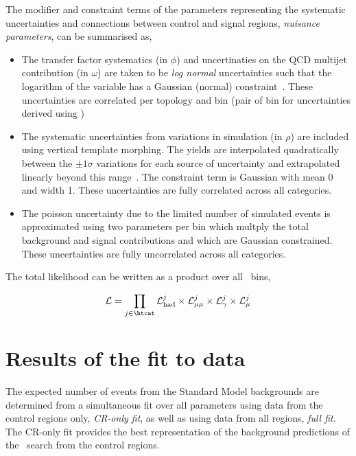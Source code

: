 The modifier and constraint terms of the parameters representing the systematic uncertainties and 
connections between control and signal regions, \emph{nuisance parameters}, can be summarised as,
\begin{itemize}
\item The transfer factor systematics (in $\phi$) and uncertinaties on the QCD multijet contribution (in $\omega$)  
are taken to be \emph{log normal} uncertainties such that the logarithm of the variable has 
a Gaussian (normal) constraint~\cite{templateMorphing}. These uncertainties are correlated per topology and \scalht bin 
(pair of \scalht bin for uncertainties derived using \mmj)
\item The systematic uncertainties from variations in simulation (in $\rho$) are included using vertical template morphing.
The yields are interpolated quadratically between the $\pm 1\sigma$ variations for each source of
uncertainty and extrapolated linearly beyond this range~\cite{templateMorphing}. The constraint term is Gaussian
with mean 0 and width 1. These uncertainties are fully correlated across all categories.
\item The poisson uncertainty due to the limited number of simulated events is approximated using
two parameters per bin which multply the total background and signal contributions and which 
are Gaussian constrained. These uncertainties are fully uncorrelated across all categories.
\end{itemize}

The total likelihood can be written as a product over all \htcat~bins,

\begin{equation}
\label{eq:totalLikelihood}
\mathcal{L} = \prod_{j\in\htcat} \mathcal{L}^{j}_{\mathrm{had}} \times \mathcal{L}^{j}_{\mathrm{\mu\mu}} 
\times \mathcal{L}^{j}_{\mathrm{\gamma}} \times \mathcal{L}^{j}_{\mathrm{\mu}}
\end{equation}


\section{Results of the fit to data}

The expected number of events from the Standard Model backgrounds are determined from 
a simultaneous fit over all parameters using data from the control regions only, \emph{CR-only fit},
as well as using data from all regions, \emph{full fit}. The CR-only fit provides the 
best representation of the background predictions of the \alphat~search from the control regions.

